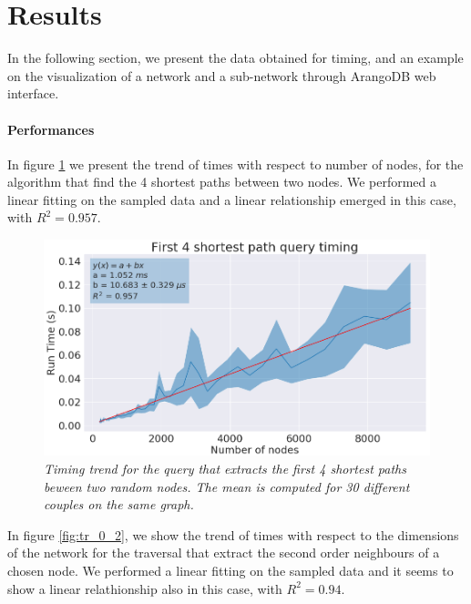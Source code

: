 \documentclass[11pt,twocolumn]{article}
\begin{document}
\section{Results}

In the following section, we present the data obtained for timing, and an example on the visualization of a network and a sub-network through ArangoDB web interface.

\paragraph{Performances}
In figure \ref{fig:sh_paths} we present the trend of times with respect to number of nodes, for the algorithm that find the 4 shortest paths between two nodes. We performed a linear fitting on the sampled data and a linear relationship emerged in this case, with $R^2 = 0.957$.

\begin{figure}[ht!]
  \includegraphics[width=\linewidth]{images/4_shortest_path_timing_readable.png}
  \caption{\small{\textit{Timing trend for the query that extracts the first 4 shortest paths beween two random nodes. The mean is computed for 30 different couples on the same graph.}}}
  \label{fig:sh_paths}
\end{figure}

In figure \ref{fig:tr_0_2}, we show the trend of times with respect to the dimensions of the network for the traversal that extract the second order neighbours of a chosen node. We performed a linear fitting on the sampled data and it seems to show a linear relathionship also in this case, with $R^2 = 0.94$.
\end{document}
